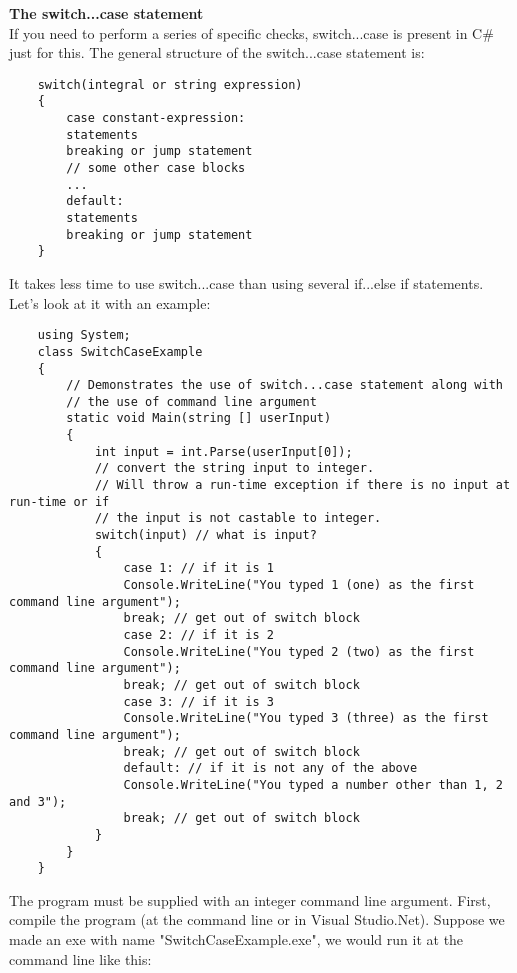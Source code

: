 \textbf{The switch...case statement}\\

If you need to perform a series of specific checks, switch...case is present in C\# just for this. The general structure
of the switch...case statement is:

\begin{lstlisting}
    switch(integral or string expression)
    {
        case constant-expression:
        statements
        breaking or jump statement
        // some other case blocks
        ...
        default:
        statements
        breaking or jump statement
    }    
\end{lstlisting}

It takes less time to use switch...case than using several if...else if statements. Let’s look at it with an example:

\begin{lstlisting}
    using System;
    class SwitchCaseExample
    {
        // Demonstrates the use of switch...case statement along with
        // the use of command line argument
        static void Main(string [] userInput)
        {
            int input = int.Parse(userInput[0]);
            // convert the string input to integer.
            // Will throw a run-time exception if there is no input at run-time or if
            // the input is not castable to integer.
            switch(input) // what is input?
            {
                case 1: // if it is 1
                Console.WriteLine("You typed 1 (one) as the first command line argument");
                break; // get out of switch block
                case 2: // if it is 2
                Console.WriteLine("You typed 2 (two) as the first command line argument");
                break; // get out of switch block
                case 3: // if it is 3
                Console.WriteLine("You typed 3 (three) as the first command line argument");
                break; // get out of switch block
                default: // if it is not any of the above
                Console.WriteLine("You typed a number other than 1, 2 and 3");
                break; // get out of switch block
            }
        }
    }    
\end{lstlisting}

The program must be supplied with an integer command line argument. First, compile the program (at the
command line or in Visual Studio.Net). Suppose we made an exe with name "SwitchCaseExample.exe", we would
run it at the command line like this:

